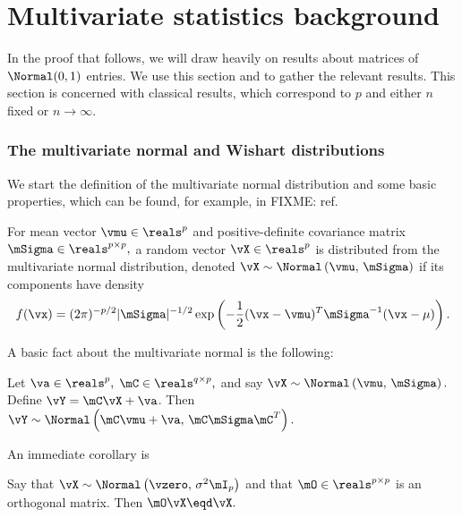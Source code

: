 
\chapter{Multivariate statistics background}

In the proof that follows, we will draw heavily on results about matrices of \iid $\Normal(0,1)$ entries. We use this section and to gather the relevant results. This section is concerned with classical results, which correspond to $p$ and either $n$ fixed or $n\to\infty$.

\subsection{The multivariate normal and Wishart distributions}

We start the definition of the multivariate normal distribution and some basic properties, which can be found, for example, in FIXME: ref.

\begin{definition}
    \label{D:multivariate-normal}
For mean vector 
\(
    \vmu \in \reals^p
\)
and positive-definite covariance matrix
\(
    \mSigma \in \reals^{p\times p},
\)
a random vector 
\(
    \vX \in \reals^p
\)
is distributed from the multivariate normal distribution, denoted 
\(
    \vX 
    \sim 
    \Normal \left(
        \vmu, \,
        \mSigma
    \right)
\)
if its components have density
\begin{equation}\label{E:normal-density}
    f( \vx )
    =
    (2 \pi )^{-p/2}
    |\mSigma|^{-1/2}
    \exp\left(
        -
        \frac{1}{2}
        (\vx - \vmu)^T
        \mSigma^{-1}
        (\vx - \mu)
    \right).
\end{equation}
\end{definition}

\noindent
A basic fact about the multivariate normal is the following:

\begin{proposition}\label{P:scale-shift-normal}
Let 
\(
    \va \in \reals^p,
\)
\(
    \mC \in \reals^{q \times p},
\)
and say
\(
    \vX 
    \sim
    \Normal \left( 
        \vmu, \,
        \mSigma
    \right).
\)
Define $\vY = \mC \vX + \va$.  Then 
\(
    \vY
    \sim
    \Normal \left( 
        \mC \vmu + \va, \,
        \mC \mSigma \mC^T
    \right).
\)
\end{proposition}

\noindent
An immediate corollary is

\begin{corollary}\label{C:normal-orthog-invariant}
Say that
\(
    \vX 
    \sim 
    \Normal \left( 
        \vzero, \,
        \sigma^2 \mI_p
    \right)
\)
and that
\(
    \mO \in \reals^{p \times p}
\)
is an orthogonal matrix.  Then
\(
    \mO \vX \eqd \vX.
\)
\end{corollary}

